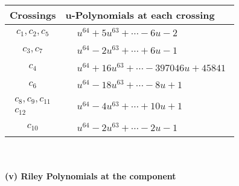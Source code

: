 \documentclass[1p]{elsarticle_modified}
\theoremstyle{definition}
\begin{document}
\begin{tabular}{m{50pt}|m{274pt}}
Crossings & \hspace{64pt}u-Polynomials at each crossing \\
\hline $$\begin{aligned}c_{1},c_{2},c_{5}\end{aligned}$$&$\begin{aligned}
&u^{64}+5 u^{63}+\cdots-6 u-2
\end{aligned}$\\
\hline $$\begin{aligned}c_{3},c_{7}\end{aligned}$$&$\begin{aligned}
&u^{64}-2 u^{63}+\cdots+6 u-1
\end{aligned}$\\
\hline $$\begin{aligned}c_{4}\end{aligned}$$&$\begin{aligned}
&u^{64}+16 u^{63}+\cdots-397046 u+45841
\end{aligned}$\\
\hline $$\begin{aligned}c_{6}\end{aligned}$$&$\begin{aligned}
&u^{64}-18 u^{63}+\cdots-8 u+1
\end{aligned}$\\
\hline $$\begin{aligned}c_{8},c_{9},c_{11}\\c_{12}\end{aligned}$$&$\begin{aligned}
&u^{64}-4 u^{63}+\cdots+10 u+1
\end{aligned}$\\
\hline $$\begin{aligned}c_{10}\end{aligned}$$&$\begin{aligned}
&u^{64}-2 u^{63}+\cdots-2 u-1
\end{aligned}$\\
\hline
\end{tabular}\\~\\
\newpage\renewcommand{\arraystretch}{1}
\flushleft \textbf{(v) Riley Polynomials at the component}\newline \\
\end{document}
